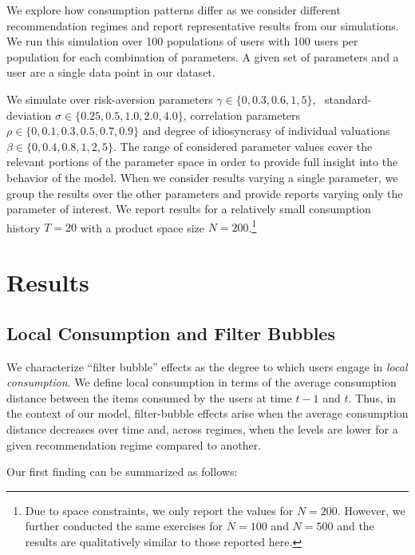 \documentclass[manuscript, nonacm]{acmart}
\begin{document}
We explore how consumption patterns differ as we consider different recommendation regimes and report representative results from our simulations. We run this simulation over 100 populations of users with 100 users per population for each combination of parameters. 
A given set of parameters and a user are a single data point in our dataset.
\par

We simulate over risk-aversion parameters $\gamma \in \{ 0, 0.3, 0.6, 1, 5 \}$, \ standard-deviation $\sigma \in \{ 0.25, 0.5, 1.0, 2.0, 4.0 \}$, correlation parameters $\rho\in \{ 0, 0.1, 0.3, 0.5, 0.7, 0.9 \} $ and degree of idiosyncrasy of individual valuations $\beta \in \{ 0, 0.4, 0.8, 1, 2, 5\}$. The range of considered parameter values cover the relevant portions of the parameter space in order to provide full insight into the behavior of the model. When we consider results varying a single parameter, we group the results over the other parameters and provide reports varying only the parameter of interest. We report results for a relatively small consumption history $T=20$ with a product space size $N=200$.\footnote{Due to space constraints, we only report the values for $N = 200$. However, we further conducted the same exercises for $N = 100$ and $N = 500$ and the results are qualitatively similar to those reported here.}
\section{Results}
\subsection{Local Consumption and Filter Bubbles}
We characterize ``filter bubble'' effects as the degree to which users engage in \textit{local consumption}. We define local consumption in terms of the average consumption distance between the items consumed by the users at time $t-1$ and $t$. Thus, in the context of our model, filter-bubble effects arise when the average consumption distance decreases over time and, across regimes, when the levels are lower for a given recommendation regime compared to another.



Our first finding can be summarized as follows:
\end{document}
